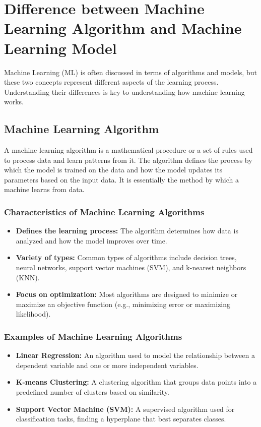 \section{Difference between Machine Learning Algorithm and Machine Learning Model}
Machine Learning (ML) is often discussed in terms of algorithms and models, but these two concepts represent different aspects of the learning process. Understanding their differences is key to understanding how machine learning works.

\subsection*{Machine Learning Algorithm}
A machine learning algorithm is a mathematical procedure or a set of rules used to process data and learn patterns from it. The algorithm defines the process by which the model is trained on the data and how the model updates its parameters based on the input data. It is essentially the method by which a machine learns from data.

\subsubsection*{Characteristics of Machine Learning Algorithms}
\begin{itemize}
    \item \textbf{Defines the learning process:} The algorithm determines how data is analyzed and how the model improves over time.
    \item \textbf{Variety of types:} Common types of algorithms include decision trees, neural networks, support vector machines (SVM), and k-nearest neighbors (KNN).
    \item \textbf{Focus on optimization:} Most algorithms are designed to minimize or maximize an objective function (e.g., minimizing error or maximizing likelihood).
\end{itemize}

\subsubsection*{Examples of Machine Learning Algorithms}
\begin{itemize}
    \item \textbf{Linear Regression:} An algorithm used to model the relationship between a dependent variable and one or more independent variables.
    \item \textbf{K-means Clustering:} A clustering algorithm that groups data points into a predefined number of clusters based on similarity.
    \item \textbf{Support Vector Machine (SVM):} A supervised algorithm used for classification tasks, finding a hyperplane that best separates classes.
\end{itemize}

